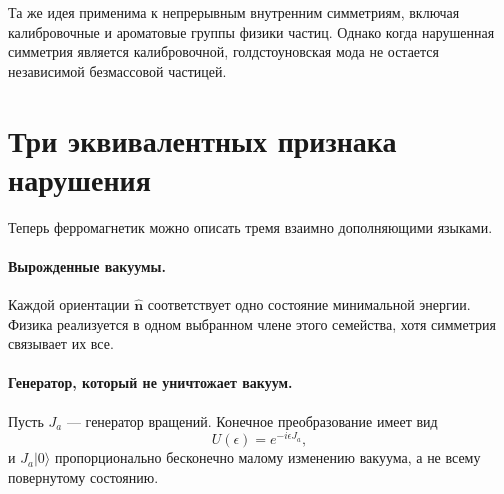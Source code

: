 
Та же идея применима к непрерывным внутренним симметриям, включая калибровочные и ароматовые группы физики частиц. Однако когда нарушенная симметрия является калибровочной, голдстоуновская мода не остается независимой безмассовой частицей.

\begin{classroomqa}
\end{classroomqa}

\section{Три эквивалентных признака нарушения}

Теперь ферромагнетик можно описать тремя взаимно дополняющими языками.

\paragraph{Вырожденные вакуумы.}
Каждой ориентации \(\hat{\mathbf n}\) соответствует одно состояние минимальной энергии. Физика реализуется в одном выбранном члене этого семейства, хотя симметрия связывает их все.

\paragraph{Генератор, который не уничтожает вакуум.}
Пусть \(J_a\) — генератор вращений. Конечное преобразование имеет вид
\begin{equation}
U(\epsilon)=e^{-i\epsilon J_a},
\end{equation}
и \(J_a|0\rangle\) пропорционально бесконечно малому изменению вакуума, а не всему повернутому состоянию.

\begin{classroomqa}
\end{classroomqa}

